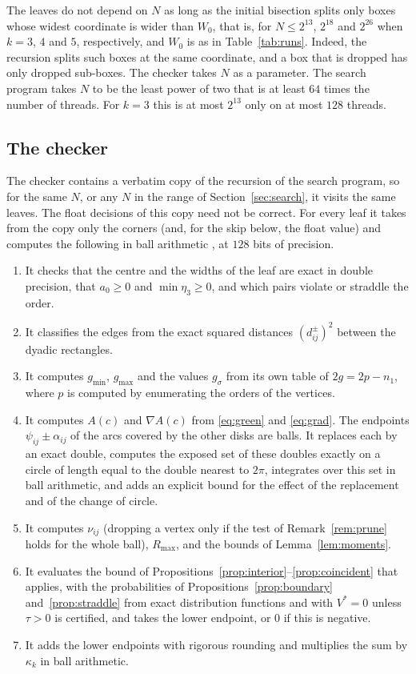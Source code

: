 \documentclass[11pt]{amsart}
\theoremstyle{definition}
\theoremstyle{remark}
\numberwithin{equation}{section}
\newcommand{\gmin}{g_{\min}}
\newcommand{\gmax}{g_{\max}}
\begin{document}
The leaves do not depend on $N$ as long as the initial bisection splits only boxes whose widest coordinate is wider than $W_0$, that is, for $N\le2^{13}$, $2^{18}$ and $2^{26}$ when $k=3$, $4$ and $5$, respectively, and $W_0$ is as in Table~\ref{tab:runs}. Indeed, the recursion splits such boxes at the same coordinate, and a box that is dropped has only dropped sub-boxes. The checker takes $N$ as a parameter. The search program takes $N$ to be the least power of two that is at least $64$ times the number of threads. For $k=3$ this is at most $2^{13}$ only on at most $128$ threads.

\subsection{The checker}\label{sec:checker}
The checker contains a verbatim copy of the recursion of the search program, so for the same $N$, or any $N$ in the range of Section~\ref{sec:search}, it visits the same leaves. The float decisions of this copy need not be correct. For every leaf it takes from the copy only the corners (and, for the skip below, the float value) and computes the following in ball arithmetic \cite{Joh17}, at $128$ bits of precision.
\begin{enumerate}[label=(\arabic*),leftmargin=*]
\item It checks that the centre and the widths of the leaf are exact in double precision, that $a_0\ge0$ and $\min\eta_3\ge0$, and which pairs violate or straddle the order.
\item It classifies the edges from the exact squared distances $(d^\pm_{ij})^2$ between the dyadic rectangles.
\item It computes $\gmin$, $\gmax$ and the values $g_\sigma$ from its own table of $2g=2p-n_1$, where $p$ is computed by enumerating the orders of the vertices.
\item It computes $A(c)$ and $\nabla A(c)$ from \eqref{eq:green} and \eqref{eq:grad}. The endpoints $\psi_{ij}\pm\alpha_{ij}$ of the arcs covered by the other disks are balls. It replaces each by an exact double, computes the exposed set of these doubles exactly on a circle of length equal to the double nearest to $2\pi$, integrates over this set in ball arithmetic, and adds an explicit bound for the effect of the replacement and of the change of circle.
\item It computes $\nu_{ij}$ (dropping a vertex only if the test of Remark~\ref{rem:prune} holds for the whole ball), $R_{\max}$, and the bounds of Lemma~\ref{lem:moments}.
\item It evaluates the bound of Propositions~\ref{prop:interior}--\ref{prop:coincident} that applies, with the probabilities of Propositions~\ref{prop:boundary} and~\ref{prop:straddle} from exact distribution functions and with $V^*=0$ unless $\tau>0$ is certified, and takes the lower endpoint, or $0$ if this is negative.
\item It adds the lower endpoints with rigorous rounding and multiplies the sum by $\kappa_k$ in ball arithmetic.
\end{enumerate}
\end{document}
